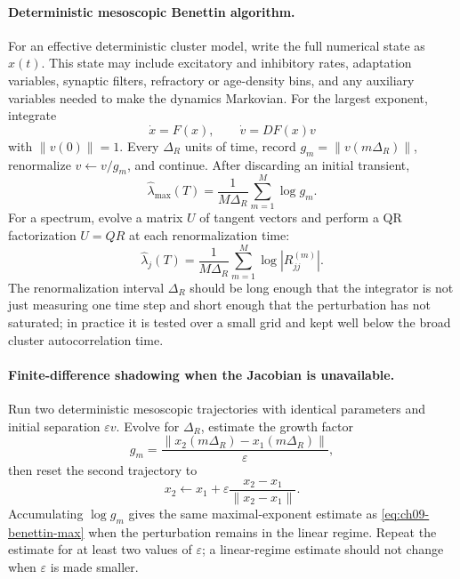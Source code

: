 \paragraph{Deterministic mesoscopic Benettin algorithm.}
For an effective deterministic cluster model, write the full numerical state as
\(x(t)\). This state may include excitatory and inhibitory rates, adaptation
variables, synaptic filters, refractory or age-density bins, and any auxiliary
variables needed to make the dynamics Markovian. For the largest exponent,
integrate
\[
    \dot x=F(x),
    \qquad
    \dot v=D F(x)v
\]
with \(\|v(0)\|=1\). Every \(\Delta_R\) units of time, record
\(g_m=\|v(m\Delta_R)\|\), renormalize \(v\leftarrow v/g_m\), and continue.
After discarding an initial transient,
\begin{equation}
    \widehat\lambda_{\max}(T)
    =
    \frac{1}{M\Delta_R}
    \sum_{m=1}^{M}\log g_m .
    \label{eq:ch09-benettin-max}
\end{equation}
For a spectrum, evolve a matrix \(U\) of tangent vectors and perform a QR
factorization \(U=QR\) at each renormalization time:
\begin{equation}
    \widehat\lambda_j(T)
    =
    \frac{1}{M\Delta_R}
    \sum_{m=1}^{M}\log |R_{jj}^{(m)}| .
    \label{eq:ch09-qr-lyapunov}
\end{equation}
The renormalization interval \(\Delta_R\) should be long enough that the
integrator is not just measuring one time step and short enough that the
perturbation has not saturated; in practice it is tested over a small grid and
kept well below the broad cluster autocorrelation time.

\paragraph{Finite-difference shadowing when the Jacobian is unavailable.}
Run two deterministic mesoscopic trajectories with identical parameters and
initial separation \(\varepsilon v\). Evolve for \(\Delta_R\), estimate the
growth factor
\[
    g_m=\frac{\|x_2(m\Delta_R)-x_1(m\Delta_R)\|}{\varepsilon},
\]
then reset the second trajectory to
\[
    x_2\leftarrow x_1
    +
    \varepsilon
    \frac{x_2-x_1}{\|x_2-x_1\|}.
\]
Accumulating \(\log g_m\) gives the same maximal-exponent estimate as
\eqref{eq:ch09-benettin-max} when the perturbation remains in the linear
regime. Repeat the estimate for at least two values of \(\varepsilon\); a
linear-regime estimate should not change when \(\varepsilon\) is made smaller.

